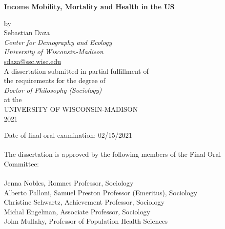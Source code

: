 \documentclass[12pt]{report}
\begin{document}

\thispagestyle{empty}

\renewcommand{\baselinestretch}{1}

\vspace*{60pt}

\begin{center}
\LARGE \textbf{Income Mobility, Mortality and Health in the US} \\
\vspace*{24pt}

\end{center}

\begin{center}
\normalsize
by \\
\vspace*{12pt}
Sebastian Daza \\
\textit{Center for Demography and Ecology \\University of Wisconsin-Madison}\\
\url{sdaza@ssc.wisc.edu}\\
\vspace*{40pt}
A dissertation submitted in partial fulfillment of \\
the requirements for the degree of\\
\vspace{12pt}
\textit{Doctor of Philosophy (Sociology)} \\
\vspace{12pt}
at the \\
\vspace{12pt}
UNIVERSITY OF WISCONSIN‐MADISON \\
\vspace{12pt}
2021
\end{center}

\vspace{60pt}
\noindent Date of final oral examination: 02/15/2021\\
\\
\noindent The dissertation is approved by the following members of the Final Oral Committee:\\
\\
\noindent Jenna Nobles, Romnes Professor, Sociology \\
\noindent Alberto Palloni, Samuel Preston Professor (Emeritus), Sociology\\
\noindent Christine Schwartz, Achievement Professor, Sociology\\
\noindent Michal Engelman, Associate Professor, Sociology \\
\noindent John Mullahy, Professor of Population Health Sciences
\end{document}
